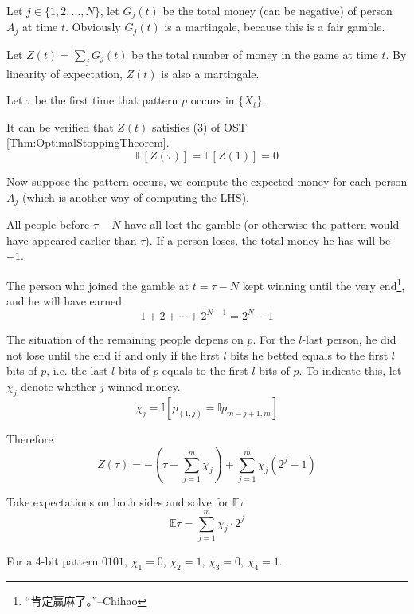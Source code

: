             Let $j \in \{1, 2, \dots, N\}$, let $G_j(t)$ be the total money (can be negative) of person $A_j$ at time $t$. Obviously $G_j(t)$ is a martingale, because this is a fair gamble.

            Let $Z(t) = \sum_j G_j(t)$ be the total number of money in the game at time $t$. By linearity of expectation, $Z(t)$ is also a martingale.

            Let $\tau$ be the first time that pattern $p$ occurs in $\{X_t\}$.

            It can be verified that $Z(t)$ satisfies (3) of OST \ref{Thm:OptimalStoppingTheorem}.
            \[ \mathbb{E}[Z(\tau)] = \mathbb{E}[Z(1)] = 0 \]

            Now suppose the pattern occurs, we compute the expected money for each person $A_j$ (which is another way of computing the LHS).

            All people before $\tau - N$ have all lost the gamble (or otherwise the pattern would have appeared earlier than $\tau$). If a person loses, the total money he has will be $-1$. 

            The person who joined the gamble at $t = \tau-N$ kept winning until the very end\footnote{“肯定赢麻了。”--Chihao}, and he will have earned
            \[ 1 + 2 + \cdots + 2^{N-1} = 2^N-1 \]

            The situation of the remaining people depens on $p$. For the $l$-last person, he did not lose until the end if and only if the first $l$ bits he betted equals to the first $l$ bits of $p$, i.e. the last $l$ bits of $p$ equals to the first $l$ bits of $p$. To indicate this, let $\chi_j$ denote whether $j$ winned money.
            \[ \chi_j = \mathbb{I}[p_{(1,j)} = \mathbb{I}p_{m-j+1,m}] \]

            Therefore
            \[Z(\tau) = -\left(\tau - \sum_{j=1}^m \chi_j\right) + \sum_{j=1}^m \chi_j(2^j-1)\]

            Take expectations on both sides and solve for $\mathbb{E}\tau$
            \[\mathbb{E}\tau = \sum_{j=1}^m\chi_j \cdot 2^j\]

            For a 4-bit pattern $0101$, $\chi_1=0$, $\chi_2 = 1$, $\chi_3=0$, $\chi_4=1$.

